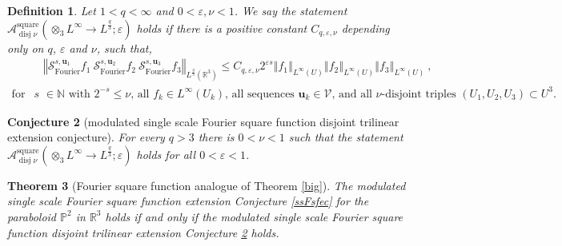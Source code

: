 \documentclass{amsart}%
\newtheorem{theorem}{Theorem}
\theoremstyle{plain}
\newtheorem{conjecture}[theorem]{Conjecture}
\newtheorem{definition}[theorem]{Definition}
\numberwithin{equation}{section}
\begin{document}
\begin{definition}
Let $1<q<\infty$ and $0<\varepsilon,\nu<1$. We say the statement
$\mathcal{A}_{\operatorname*{disj}\nu}^{\operatorname*{square}}\left(
\otimes_{3}L^{\infty}\rightarrow L^{\frac{q}{3}};\varepsilon\right)  $ holds
if there is a positive constant $C_{q,\varepsilon,\nu}$ depending only on $q$,
$\varepsilon$ and $\nu$, such that,%
\begin{align}
&  \left\Vert \mathcal{S}_{\operatorname*{Fourier}}^{s,\mathbf{u}_{1}}%
f_{1}\ \mathcal{S}_{\operatorname*{Fourier}}^{s,\mathbf{u}_{2}}f_{2}%
\ \mathcal{S}_{\operatorname*{Fourier}}^{s,\mathbf{u}_{3}}f_{3}\right\Vert
_{L^{\frac{q}{3}}\left(  \mathbb{R}^{3}\right)  }\leq C_{q,\varepsilon,\nu
}2^{\varepsilon s}\left\Vert f_{1}\right\Vert _{L^{\infty}\left(  U\right)
}\left\Vert f_{2}\right\Vert _{L^{\infty}\left(  U\right)  }\left\Vert
f_{3}\right\Vert _{L^{\infty}\left(  U\right)  }\ ,\label{single tri Four}\\
\text{for all }s  &  \in\mathbb{N}\text{ with }2^{-s}\leq\nu\text{, all }%
f_{k}\in L^{\infty}\left(  U_{k}\right)  \text{, all sequences }\mathbf{u}%
_{k}\in\mathcal{V}\text{, and all }\nu\text{-disjoint triples }\left(
U_{1},U_{2},U_{3}\right)  \subset U^{3}.\nonumber
\end{align}

\end{definition}

\begin{conjecture}
[modulated single scale Fourier square function disjoint trilinear extension
conjecture]\label{ssFsftec}For every $q>3$ there is $0<\nu<1$ such that the
statement $\mathcal{A}_{\operatorname*{disj}\nu}^{\operatorname*{square}%
}\left(  \otimes_{3}L^{\infty}\rightarrow L^{\frac{q}{3}};\varepsilon\right)
$ holds for all $0<\varepsilon<1$.
\end{conjecture}

\begin{theorem}
[Fourier square function analogue of Theorem \ref{big}]\label{SFA}The
modulated single scale Fourier square function extension Conjecture
\ref{ssFsfec} for the paraboloid $\mathbb{P}^{2}$ in $\mathbb{R}^{3}$ holds
\emph{if and only if} the modulated single scale Fourier square function
disjoint trilinear extension Conjecture \ref{ssFsftec} holds.
\end{theorem}
\end{document}
